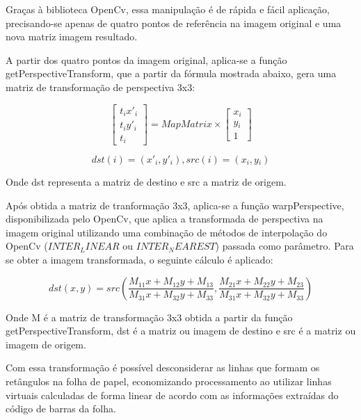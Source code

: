 \documentclass[12pt]{report}
\begin{document}
Graças à biblioteca OpenCv, essa manipulação é de rápida e fácil aplicação, precisando-se apenas de quatro pontos de referência na imagem original e uma nova matriz imagem resultado.

A partir dos quatro pontos da imagem original, aplica-se a função getPerspectiveTransform, que a partir da fórmula mostrada abaixo, gera uma matriz de transformação de perspectiva 3x3:

\begin{equation}
  \begin{bmatrix}
    t{}_i x'{}_i \\
    t{}_i y'{}_i \\
    t{}_i
  \end{bmatrix} = MapMatrix \times
  \begin{bmatrix}
    x{}_i \\
    y{}_i \\
    1
  \end{bmatrix}
\end{equation}

\begin{equation}
  dst(i) = (x'{}_i,y'{}_i), src(i) = (x{}_i,y{}_i)
\end{equation}

Onde dst representa a matriz de destino e src a matriz de origem.

Após obtida a matriz de tranformação 3x3, aplica-se a função warpPerspective, disponibilizada pelo OpenCv, que aplica a transformada de perspectiva na imagem original utilizando uma combinação de métodos de interpolação do OpenCv ({\it $INTER_LINEAR$} ou {\it $INTER_NEAREST$}) passada como parâmetro. Para se obter a imagem transformada, o seguinte cálculo é aplicado:

\begin{equation}
dst(x, y) = src \left(\dfrac{M_{11} x + M_{12} y + M_{13}}{M_{31} x + M_{32} y + M_{33}}, \dfrac{M_{21} x + M_{22} y + M_{23}}{M_{31} x + M_{32} y + M_{33}}\right)
\end{equation}

Onde M é a matriz de transformação 3x3 obtida a partir da função getPerspectiveTransform, dst é a matriz ou imagem de destino e src é a matriz ou imagem de origem.

Com essa transformação é possível desconsiderar as linhas que formam os retângulos na folha de papel, economizando processamento ao utilizar linhas virtuais calculadas de forma linear de acordo com as informações extraídas do código de barras da folha.
\end{document}
